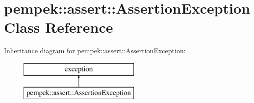 \hypertarget{classpempek_1_1assert_1_1_assertion_exception}{}\section{pempek\+:\+:assert\+:\+:Assertion\+Exception Class Reference}
\label{classpempek_1_1assert_1_1_assertion_exception}
Inheritance diagram for pempek\+:\+:assert\+:\+:Assertion\+Exception\+:\begin{figure}[H]
\begin{center}
\leavevmode
\includegraphics[height=2.000000cm]{classpempek_1_1assert_1_1_assertion_exception}
\end{center}
\end{figure}
